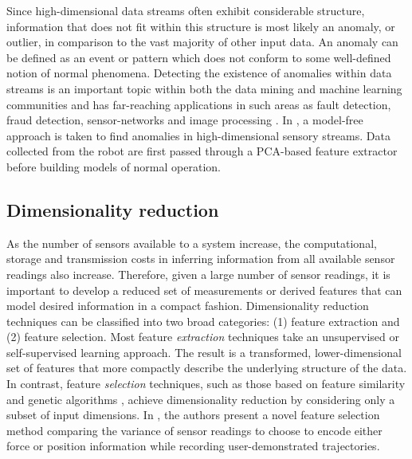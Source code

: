 Since high-dimensional data streams often exhibit considerable structure, information that does not fit within this structure is most likely an anomaly, or outlier, in comparison to the vast majority of other input data.
An anomaly can be defined as an event or pattern which does not conform to some well-defined notion of normal phenomena.
Detecting the existence of anomalies within data streams is an important topic within both the data mining and machine learning communities \cite{aggarwal2003framework,kifer2004detecting,dasu2006information,yamanishi2002unifying,song2007statistical} and has far-reaching applications in such areas as fault detection, fraud detection, sensor-networks and image processing \cite{Chandola2009}.
In \cite{hornung2014anomaly}, a model-free approach is taken to find anomalies in high-dimensional sensory streams. Data collected from the robot are first passed through a PCA-based feature extractor before building models of normal operation.


\subsection{Dimensionality reduction}

As the number of sensors available to a system increase, the computational, storage and transmission costs in inferring information from all available sensor readings also increase.
Therefore, given a large number of sensor readings, it is important to develop a reduced set of measurements or derived features that can model desired information in a compact fashion.  
Dimensionality reduction techniques can be classified into two broad categories: (1) feature extraction and (2) feature selection.  Most feature \emph{extraction} techniques take an unsupervised \cite{ghahramani1996algorithm,saul2003think,tenenbaum2000global,hein2010unsupervised} or self-supervised \cite{angelova2007dimensionality,dahlkamp2006self,lieb2005adaptive,sofman2006improving} learning approach.  
The result is a transformed, lower-dimensional set of features that more compactly describe the underlying structure of the data.  
In contrast, feature \emph{selection} techniques, such as those based on feature similarity \cite{mitra2002unsupervised} and genetic algorithms \cite{huang2006ga}, achieve dimensionality reduction by considering only a subset of input dimensions. 
In \cite{pais2013learning}, the authors present a novel feature selection method comparing the variance of sensor readings to choose to encode either force or position information while recording user-demonstrated trajectories.

